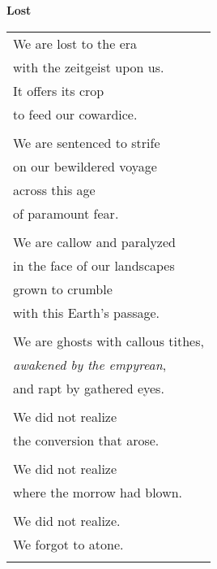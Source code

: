 \documentclass{article}
\begin{document}
\begin{center}
\textbf{Lost}\\
\begin{tabular}{l}
\\
We are lost to the era \\
with the zeitgeist upon us. \\
It offers its crop \\
to feed our cowardice. \\
\\
We are sentenced to strife \\
on our bewildered voyage \\
across this age \\
of paramount fear. \\
\\
We are callow and paralyzed \\
in the face of our landscapes \\
grown to crumble \\
with this Earth's passage. \\
\\
We are ghosts with callous tithes, \\
\textit{awakened by the empyrean}, \\
and rapt by gathered eyes. \\
\\
We did not realize \\
the conversion that arose. \\
\\
We did not realize \\
where the morrow had blown. \\ %
\\
We did not realize. \\
We forgot to atone. \\
\\
\end{tabular}
\end{center}
\end{document}
